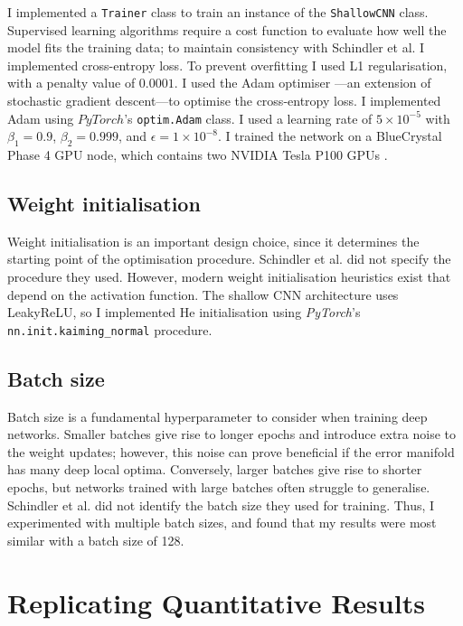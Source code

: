 \documentclass[conference]{IEEEtran}
\begin{document}
I implemented a \texttt{Trainer} class to train an instance of the \texttt{ShallowCNN} class.
Supervised learning algorithms require a cost function to evaluate how well the model fits the training data; to maintain consistency with Schindler et al. I implemented cross-entropy loss.
To prevent overfitting I used L1 regularisation, with a penalty value of $0.0001$.
I used the Adam optimiser \cite{KingmaBa}---an extension of stochastic gradient descent---to optimise the cross-entropy loss.
I implemented Adam using $PyTorch$'s \texttt{optim.Adam} class.
I used a learning rate of $5\times10^{-5}$ with $\beta_1=0.9$, $\beta_2=0.999$, and $\epsilon=1\times10^{-8}$.
I trained the network on a BlueCrystal Phase 4 GPU node, which contains two NVIDIA Tesla P100 GPUs \cite{bc4}.

\subsection{Weight initialisation}

Weight initialisation is an important design choice, since it determines the starting point of the optimisation procedure.
Schindler et al. did not specify the procedure they used.
However, modern weight initialisation heuristics exist that depend on the activation function.
The shallow CNN architecture uses LeakyReLU, so I implemented He initialisation using \textit{PyTorch}'s \texttt{nn.init.kaiming\_normal} procedure.

\subsection{Batch size}

Batch size is a fundamental hyperparameter to consider when training deep networks.
Smaller batches give rise to longer epochs and introduce extra noise to the weight updates; however, this noise can prove beneficial if the error manifold has many deep local optima.
Conversely, larger batches give rise to shorter epochs, but networks trained with large batches often struggle to generalise.
Schindler et al. did not identify the batch size they used for training.
Thus, I experimented with multiple batch sizes, and found that my results were most similar with a batch size of 128.

\section{Replicating Quantitative Results}
\end{document}
